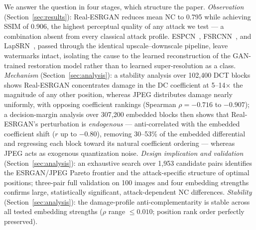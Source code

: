 \documentclass[conference]{IEEEtran}
\begin{document}
We answer the question in four stages, which structure the paper.
\emph{Observation} (Section~\ref{sec:results}): Real-ESRGAN reduces
mean NC to 0.795 while achieving SSIM of 0.906, the highest perceptual
quality of any attack we test --- a combination absent from every
classical attack profile. ESPCN~\cite{espcn2016},
FSRCNN~\cite{fsrcnn2016}, and LapSRN~\cite{lapsrn2017}, passed through
the identical upscale--downscale pipeline, leave watermarks intact,
isolating the cause to the learned reconstruction of the GAN-trained
restoration model rather than to learned super-resolution as a class.
\emph{Mechanism} (Section~\ref{sec:analysis}): a stability analysis over
102,400 DCT blocks shows Real-ESRGAN concentrates damage in the DC
coefficient at 5--14$\times$ the magnitude of any other position, whereas
JPEG distributes damage nearly uniformly, with opposing coefficient
rankings (Spearman $\rho = -0.716$ to $-0.907$); a decision-margin
analysis over 307,200 embedded blocks then shows that Real-ESRGAN's
perturbation is \emph{endogenous} --- anti-correlated with the embedded
coefficient shift ($r$ up to $-0.80$), removing 30--53\% of the embedded
differential and regressing each block toward its natural coefficient
ordering --- whereas JPEG acts as exogenous quantization noise.
\emph{Design implication and validation}
(Section~\ref{sec:analysis}): an exhaustive search over 1,953 candidate
pairs identifies the ESRGAN/JPEG Pareto frontier and the attack-specific
structure of optimal positions; three-pair full validation on 100 images
and four embedding strengths confirms large, statistically significant,
attack-dependent NC differences.
\emph{Stability} (Section~\ref{sec:analysis}): the damage-profile
anti-complementarity is stable across all tested embedding strengths
($\rho$ range $\leq 0.010$; position rank order perfectly preserved).
\end{document}
